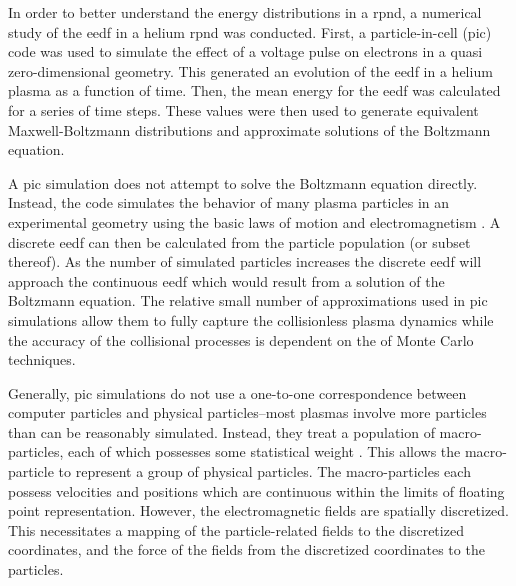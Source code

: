 In order to better understand the energy distributions in a \acs{rpnd}, a
numerical study of the \acs{eedf} in a helium \acs{rpnd} was conducted. First, a
particle-in-cell (\acs{pic}) code was used to simulate the effect of a voltage
pulse on electrons in a quasi zero-dimensional geometry. This generated an
evolution of the \acs{eedf} in a helium plasma as a function of time. Then, the
mean energy for the \acs{eedf} was calculated for a series of time steps. These
values were then used to generate equivalent Maxwell-Boltzmann distributions and
approximate solutions of the Boltzmann equation.

A \acs{pic} simulation does not attempt to solve the Boltzmann equation
directly. Instead, the code simulates the behavior of many plasma particles in
an experimental geometry using the basic laws of motion and electromagnetism
\cite{Birdsall1991}. A discrete \acs{eedf} can then be calculated from the
particle population (or subset thereof). As the number of simulated particles
increases the discrete \acs{eedf} will approach the continuous \acs{eedf} which
would result from a solution of the Boltzmann equation. The relative small
number of approximations used in \acs{pic} simulations allow them to fully
capture the collisionless plasma dynamics \cite{Pritchett2003} while the
accuracy of the collisional processes is dependent on the of Monte Carlo
techniques.

Generally, \acs{pic} simulations do not use a one-to-one correspondence between
computer particles and physical particles--most plasmas involve more particles
than can be reasonably simulated. Instead, they treat a population of
macro-particles, each of which possesses some statistical weight
\cite{Birdsall1991}. This allows the macro-particle to represent a group of
physical particles. The macro-particles each possess velocities and positions
which are continuous within the limits of floating point representation.
However, the electromagnetic fields are spatially discretized. This necessitates
a mapping of the particle-related fields to the discretized coordinates, and the
force of the fields from the discretized coordinates to the particles.

